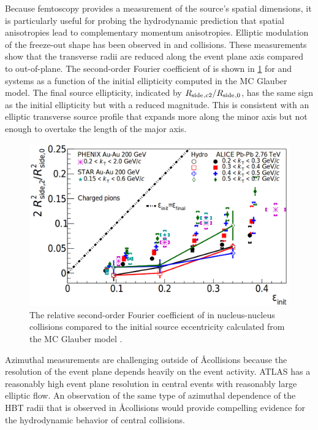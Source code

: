 Because femtoscopy provides a measurement of the source's spatial dimensions, it is particularly useful for probing the hydrodynamic prediction that spatial anisotropies lead to complementary momentum anisotropies.
Elliptic modulation of the freeze-out shape has been observed in \AuAu \cite{Adams:2003ra,Adare:2014vax,Adamczyk:2014mxp} and \PbPb \cite{Adamova:2017opl} collisions.
These measurements show that the transverse radii are reduced along the event plane axis compared to out-of-plane.
The second-order Fourier coefficient of \Rside is shown in \cref{fig:rside_v2_aa} for \AuAu and \PbPb systems as a function of the initial ellipticity computed in the MC Glauber model.
The final source ellipticity, indicated by $R_{\mathrm{side}}{}_{,c2} / R_{\mathrm{side}}{}_{,0}$, has the same sign as the initial ellipticity but with a reduced magnitude.
This is consistent with an elliptic transverse source profile that expands more along the minor axis but not enough to overtake the length of the major axis.

\begin{figure}[t]
  \includegraphics{azi_hbt_aa_ellipticity.png}
  \caption{The relative second-order Fourier coefficient of \Rside in nucleus-nucleus collisions compared to the initial source eccentricity calculated from the MC Glauber model \cite{Adamova:2017opl}.}
  \label{fig:rside_v2_aa}
\end{figure}

Azimuthal measurements are challenging outside of \AA collisions because the resolution of the event plane \psit depends heavily on the event activity.
ATLAS has a reasonably high event plane resolution in central \pPb events with reasonably large elliptic flow.
An observation of the same type of azimuthal dependence of the \ac{HBT} radii that is observed in \AA collisions would provide compelling evidence for the hydrodynamic behavior of central \pPb collisions.
